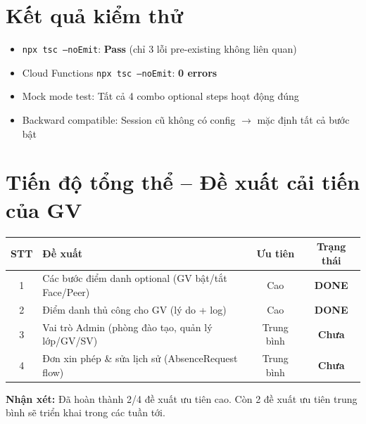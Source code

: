 \documentclass{article}
\begin{document}
\section{Kết quả kiểm thử}

\begin{itemize}[leftmargin=1.5em]
  \item \texttt{npx tsc --noEmit}: \textcolor{statusgreen}{\textbf{Pass}} (chỉ 3 lỗi pre-existing không liên quan)
  \item Cloud Functions \texttt{npx tsc --noEmit}: \textcolor{statusgreen}{\textbf{0 errors}}
  \item Mock mode test: Tất cả 4 combo optional steps hoạt động đúng
  \item Backward compatible: Session cũ không có config $\rightarrow$ mặc định tất cả bước bật
\end{itemize}

\section{Tiến độ tổng thể -- Đề xuất cải tiến của GV}

\begin{center}
\begin{tabularx}{\textwidth}{@{}c X c c@{}}
\toprule
\textbf{STT} & \textbf{Đề xuất} & \textbf{Ưu tiên} & \textbf{Trạng thái} \\
\midrule
1 & Các bước điểm danh optional (GV bật/tắt Face/Peer) & Cao & \textcolor{statusgreen}{\textbf{DONE}} \\
2 & Điểm danh thủ công cho GV (lý do + log) & Cao & \textcolor{statusgreen}{\textbf{DONE}} \\
3 & Vai trò Admin (phòng đào tạo, quản lý lớp/GV/SV) & Trung bình & \textcolor{statusamber}{\textbf{Chưa}} \\
4 & Đơn xin phép \& sửa lịch sử (AbsenceRequest flow) & Trung bình & \textcolor{statusamber}{\textbf{Chưa}} \\
\bottomrule
\end{tabularx}
\end{center}

\textbf{Nhận xét:} Đã hoàn thành 2/4 đề xuất ưu tiên cao. Còn 2 đề xuất ưu tiên trung bình sẽ triển khai trong các tuần tới.

\end{document}
